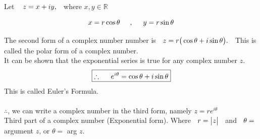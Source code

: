 \documentclass[11pt,a4paper]{article}
\begin{document}
Let $\hspace{0.3cm} z = x + i y,\hspace{0.2cm}$ where $x,y\in \mathbb{R}$

\begin{figure}[H]
\centering
{}
\end{figure}






















$$ x = r\cos \theta \hspace{0.5cm}, \hspace{0.5cm} y = r\sin \theta$$

The second form of a complex number number is $\hspace{0.2cm} z = r\big( \cos \theta + i \sin \theta\big).\hspace{0.2cm}$ This is called the polar form of a complex number.\\

It can be shown that the exponential series is true for any complex number $z$. $$\boxed{\therefore\hspace{0.5cm} e^{i\theta} = \cos \theta + i\sin \theta}$$
This is called Euler's Formula.\\\\



$\therefore$, we can write a complex number in the third form, namely \hspace{0.2cm}$ z = re^{i\theta}$\\

Third part of a complex number (Exponential form). Where $\hspace{0.2cm} r = \begin{vmatrix}
z\\
\end{vmatrix}\hspace{0.2cm}$ and $\hspace{0.2cm} \theta = $ argument $z$, or $\theta = $ arg $z$.
\end{document}
